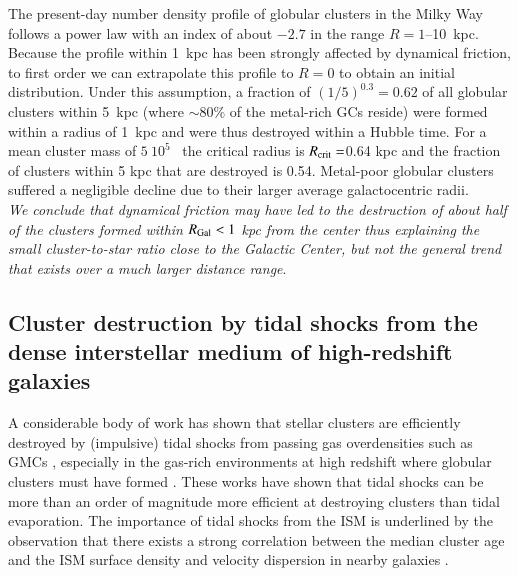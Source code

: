 \documentclass{aa}
\begin{document}
 The present-day number density profile of globular clusters in the Milky Way follows a power law with an index of about $-2.7$ in the range $R=1$--10~kpc. 
Because the profile within 1~kpc has been strongly affected by dynamical friction, to first order we can extrapolate this profile to $R=0$ to obtain an initial distribution. Under this assumption, a fraction of $(1/5)^{0.3}=0.62$ of all globular clusters within 5~kpc (where $\sim80\%$ of the metal-rich GCs reside) were formed within a radius of 1~kpc and were thus destroyed within a Hubble time.
For a mean cluster mass of $5~10^5$ \Msun\ the critical radius is $R_{\rm crit} = $0.64 kpc
and the fraction of clusters within 5 kpc that are destroyed is 0.54.
 Metal-poor globular clusters suffered a negligible decline due to their larger average galactocentric radii.\\
{\it We conclude that dynamical friction may have led to the destruction of about half of the clusters formed within $R_{\rm Gal} < 1$ kpc from the center thus explaining the small cluster-to-star ratio close to  the Galactic Center, but not the general trend that exists over a much larger distance range}.


\subsection{Cluster destruction by tidal shocks from the dense interstellar medium of high-redshift galaxies} \label{sec:shocks}

A considerable body of work has shown that stellar clusters are efficiently destroyed by (impulsive) tidal shocks from passing gas overdensities such as GMCs \citep[e.g.][]{lamers06a,gieles06,kruijssen11}, especially in the gas-rich environments at high redshift where globular clusters must have formed \citep{elmegreen10,kruijssen15b}. These works have shown that tidal shocks can be more than an order of magnitude more efficient at destroying clusters than tidal evaporation. The importance of tidal shocks from the ISM is underlined by the observation that there exists a strong correlation between the median cluster age and the ISM surface density and velocity dispersion in nearby galaxies \citep{miholics17}.
\end{document}
